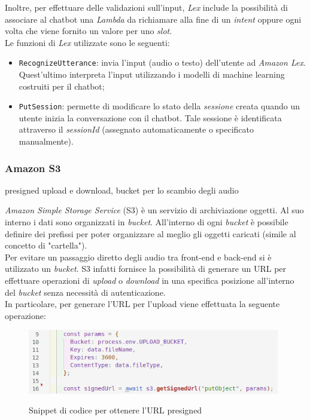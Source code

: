 		\noindent Inoltre, per effettuare delle validazioni sull'input, \emph{Lex} include la possibilità di associare al \gls{chatbot} una \emph{Lambda} da richiamare alla fine di un \emph{intent} oppure ogni volta che viene fornito un valore per uno \emph{slot}. \\
		Le funzioni di \emph{Lex} utilizzate sono le seguenti:
		\begin{itemize}
			\item \texttt{RecognizeUtterance}: invia l'input (audio o testo) dell'utente ad \emph{Amazon Lex}. Quest'ultimo interpreta l'input utilizzando i modelli di machine learning costruiti per il \gls{chatbot};
			
			\item \texttt{PutSession}: permette di modificare lo stato della \emph{sessione} creata quando un utente inizia la conversazione con il \gls{chatbot}. Tale sessione è identificata attraverso il \emph{sessionId} (assegnato automaticamente o specificato manualmente). 
		\end{itemize}
		
		\subsubsection{Amazon S3}
		presigned upload e download, bucket per lo scambio degli audio
		
		\emph{Amazon Simple Storage Service} (S3) è un servizio di archiviazione oggetti. Al suo interno i dati sono 
		organizzati in \emph{bucket}. All'interno di ogni \emph{bucket} è possibile definire dei prefissi per poter 
		organizzare al meglio gli oggetti caricati (simile al concetto di "cartella"). \\ 
		Per evitare un passaggio diretto degli audio tra front-end e back-end si è utilizzato un \emph{bucket}. S3 
		infatti fornisce la possibilità di generare un URL per effettuare operazioni di \emph{upload} o 
		\emph{download} in una specifica posizione all'interno del \emph{bucket} senza necessità di autenticazione. \\ 
		In particolare, per generare l'URL per l'upload viene effettuata la seguente operazione:
		
		\begin{figure}[H]
			\centering
			\includegraphics[width=11cm]{immagini/getURL.png} \\
			\caption{\label{fig:getURLAudio} Snippet di codice per ottenere l'URL presigned}
		\end{figure}
		
